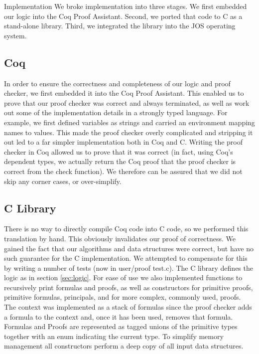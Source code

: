 \documentclass[10pt]{article}
\begin{document}
\begin{section}{Implementation}
We broke implementation into three stages.  We first embedded our logic into the Coq Proof Assistant.  Second, we ported that code to C as a stand-alone library.  Third, we integrated the library into the JOS operating system.
\subsection{Coq}
In order to ensure the correctness and completeness of our logic and proof checker, we first embedded it into the Coq Proof Assistant.  This enabled us to prove that our proof checker was correct and always terminated, as well as work out some of the implementation details in a strongly typed language.  For example, we first defined variables as strings and carried an environment mapping names to values.  This made the proof checker overly complicated and stripping it out led to a far simpler implementation both in Coq and C.  Writing the proof checker in Coq allowed us to prove that it was correct (in fact, using Coq's dependent types, we actually return the Coq proof that the proof checker is correct from the check function).  We therefore can be assured that we did not skip any corner cases, or over-simplify.
\subsection{C Library}
There is no way to directly compile Coq code into C code, so we performed this translation by hand.  This obviously invalidates our proof of correctness.  We gained the fact that our algorithms and data structures were correct, but have no such guarantee for the C implementation.  We attempted to compensate for this by writing a number of tests (now in \textsf{user/proof test.c}).  The C library defines the logic as in section \ref{sec:logic}.  For ease of use we also implemented functions to recursively print formulas and proofs, as well as constructors for primitive proofs, primitive formulas, principals, and for more complex, commonly used, proofs.  
\newline\newline
The context was implemented as a stack of formulas since the proof checker adds a formula to the context and, once it has been used, removes that formula.  Formulas and Proofs are represented as tagged \textsf{union}s of the primitive types together with an \textsf{enum} indicating the current type.  To simplify memory management all constructors perform a deep copy of all input data structures.

\end{section}
\end{document}
